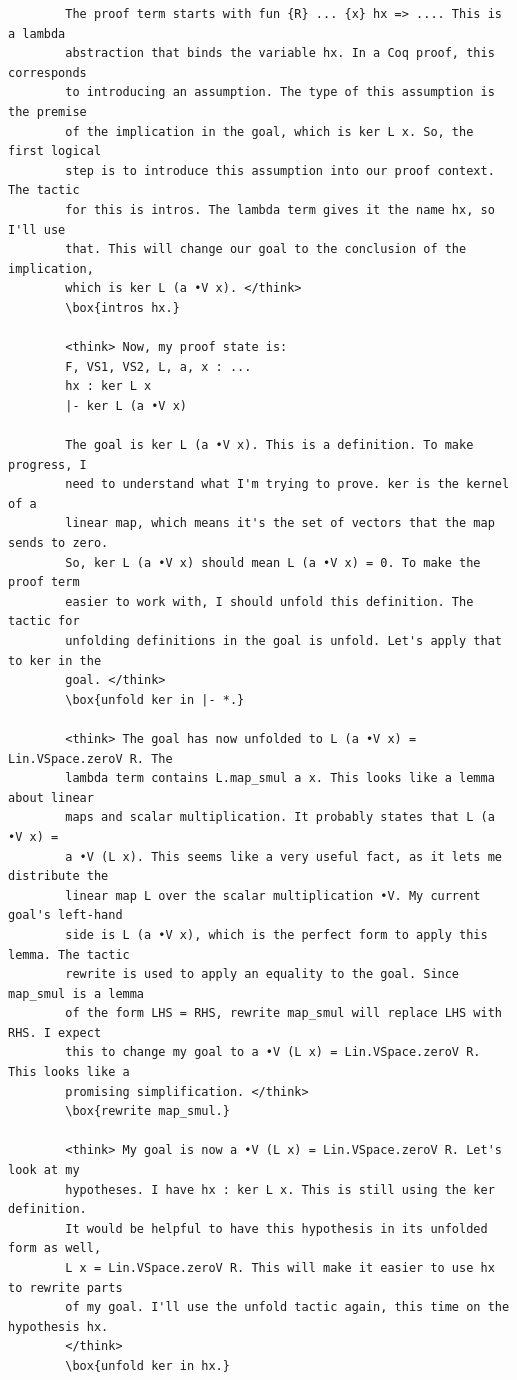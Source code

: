 \documentclass{article}
\theoremstyle{plain}
\theoremstyle{definition}
\theoremstyle{remark}
\begin{document}
	\begin{verbatim}
		The proof term starts with fun {R} ... {x} hx => .... This is a lambda
		abstraction that binds the variable hx. In a Coq proof, this corresponds
		to introducing an assumption. The type of this assumption is the premise
		of the implication in the goal, which is ker L x. So, the first logical
		step is to introduce this assumption into our proof context. The tactic
		for this is intros. The lambda term gives it the name hx, so I'll use
		that. This will change our goal to the conclusion of the implication,
		which is ker L (a •V x). </think>
		\box{intros hx.}
		
		<think> Now, my proof state is:
		F, VS1, VS2, L, a, x : ...
		hx : ker L x
		|- ker L (a •V x)
		
		The goal is ker L (a •V x). This is a definition. To make progress, I
		need to understand what I'm trying to prove. ker is the kernel of a
		linear map, which means it's the set of vectors that the map sends to zero.
		So, ker L (a •V x) should mean L (a •V x) = 0. To make the proof term
		easier to work with, I should unfold this definition. The tactic for
		unfolding definitions in the goal is unfold. Let's apply that to ker in the
		goal. </think>
		\box{unfold ker in |- *.}
		
		<think> The goal has now unfolded to L (a •V x) = Lin.VSpace.zeroV R. The
		lambda term contains L.map_smul a x. This looks like a lemma about linear
		maps and scalar multiplication. It probably states that L (a •V x) =
		a •V (L x). This seems like a very useful fact, as it lets me distribute the
		linear map L over the scalar multiplication •V. My current goal's left-hand
		side is L (a •V x), which is the perfect form to apply this lemma. The tactic
		rewrite is used to apply an equality to the goal. Since map_smul is a lemma
		of the form LHS = RHS, rewrite map_smul will replace LHS with RHS. I expect
		this to change my goal to a •V (L x) = Lin.VSpace.zeroV R. This looks like a
		promising simplification. </think>
		\box{rewrite map_smul.}
		
		<think> My goal is now a •V (L x) = Lin.VSpace.zeroV R. Let's look at my
		hypotheses. I have hx : ker L x. This is still using the ker definition.
		It would be helpful to have this hypothesis in its unfolded form as well,
		L x = Lin.VSpace.zeroV R. This will make it easier to use hx to rewrite parts
		of my goal. I'll use the unfold tactic again, this time on the hypothesis hx.
		</think>
		\box{unfold ker in hx.}
		

\end{verbatim}
\end{document}
